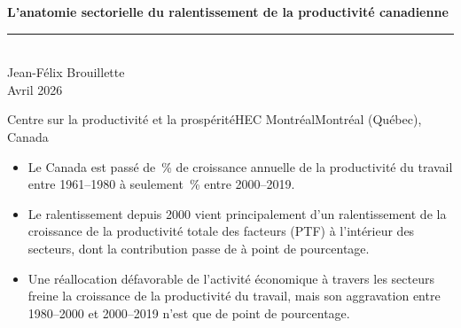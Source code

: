 \documentclass[11pt, letterpaper]{article}
\begin{document}
\makeatletter
\@fileswtrue
\makeatother

\thispagestyle{empty}


\vspace*{1.8cm}

\hspace{0.8cm}%
\begin{minipage}{0.85\textwidth}
   \raggedright
   {\fontsize{28}{34}\selectfont\bfseries\textcolor{HECnavy}{L'anatomie sectorielle du ralentissement de la productivité canadienne}}
   \\[14pt]
   {\color{HECgreen}\rule{3cm}{2pt}}
   \\[14pt]
   {\large\textcolor{HECgray}{Jean-Félix Brouillette}}
   \\[8pt]
   {\textcolor{HECgray}{Avril 2026}}
\end{minipage}

\vfill

\hspace{0.8cm}%
{\small\textcolor{HECgray}{Centre sur la productivité et la prospérité\enspace\textbar\enspace HEC Montréal\enspace\textbar\enspace Montréal (Québec), Canada}}

\vspace{1cm}
\newpage


\begin{execbox}
\begin{itemize}\small
  \item Le Canada est passé de \LPGrowthEarly\,\% de croissance annuelle de la productivité du travail entre 1961--1980 à seulement \LPGrowthLate\,\% entre 2000--2019.
  \item Le ralentissement depuis 2000 vient principalement d'un ralentissement de la croissance de la productivité totale des facteurs (PTF) à l'intérieur des secteurs, dont la contribution passe de \WithinContributionMid{} à \WithinContributionLate{} point de pourcentage.
  \item Une réallocation défavorable de l'activité économique à travers les secteurs freine la croissance de la productivité du travail, mais son aggravation entre 1980--2000 et 2000--2019 n'est que de \ReallocationWorseningMidLate{} point de pourcentage.
\end{itemize}
\end{execbox}
\end{document}
